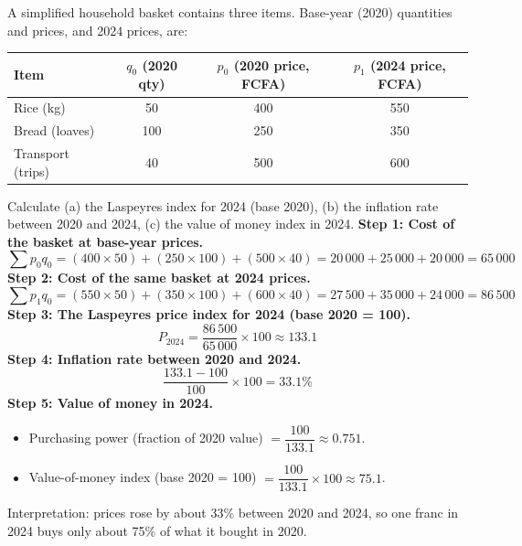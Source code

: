 \documentclass[11pt]{article}
\begin{document}
\begin{exoresolu}
A simplified household basket contains three items. Base-year (2020) quantities and prices, and 2024 prices, are:

\begin{center}
\begin{tabular}{|l|c|c|c|}
\hline
\rowcolor{popblueL} Item & $q_0$ (2020 qty) & $p_0$ (2020 price, FCFA) & $p_1$ (2024 price, FCFA) \\
\hline
Rice (kg) & 50 & 400 & 550 \\
\hline
Bread (loaves) & 100 & 250 & 350 \\
\hline
Transport (trips) & 40 & 500 & 600 \\
\hline
\end{tabular}
\end{center}

Calculate (a) the Laspeyres index for 2024 (base 2020), (b) the inflation rate between 2020 and 2024, (c) the value of money index in 2024.
\tcblower
\textbf{Step 1: Cost of the basket at base-year prices.}
\[
\sum p_0 q_0 = (400\times 50) + (250\times 100) + (500\times 40) = 20\,000 + 25\,000 + 20\,000 = 65\,000
\]
\textbf{Step 2: Cost of the same basket at 2024 prices.}
\[
\sum p_1 q_0 = (550\times 50) + (350\times 100) + (600\times 40) = 27\,500 + 35\,000 + 24\,000 = 86\,500
\]
\textbf{Step 3: The Laspeyres price index for 2024 (base 2020 = 100).}
\[
P_{2024} = \frac{86\,500}{65\,000}\times 100 \approx 133.1
\]
\textbf{Step 4: Inflation rate between 2020 and 2024.}
\[
\frac{133.1 - 100}{100}\times 100 = 33.1\%
\]
\textbf{Step 5: Value of money in 2024.}
\begin{itemize}
\item Purchasing power (fraction of 2020 value) $= \dfrac{100}{133.1} \approx 0.751$.
\item Value-of-money index (base 2020 = 100) $= \dfrac{100}{133.1}\times 100 \approx 75.1$.
\end{itemize}
Interpretation: prices rose by about 33\% between 2020 and 2024, so one franc in 2024 buys only about 75\% of what it bought in 2020.
\end{exoresolu}
\end{document}
